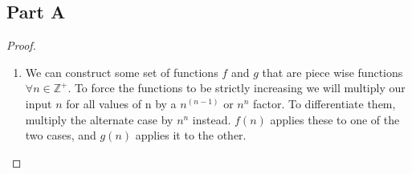 \documentclass{article}
\newcommand{\ZZ}{\mathbb{Z}} %
\begin{document}
\subsection{Part A}
\begin{proof}

      \begin{enumerate}
            \item We can construct some set of functions $f$ and $g$ that are piece wise
                  functions $\forall n \in \ZZ^+$. To force the functions to be strictly increasing we will
                  multiply our input $n$
                  for all values of n by a $n^(n-1)$ or $n^n$ factor. To differentiate them, multiply
                  the alternate case by $n^n$ instead. $f(n)$ applies these to one of the two
                  cases, and $g(n)$ applies it to the other.


\end{enumerate}
\end{proof}
\end{document}
